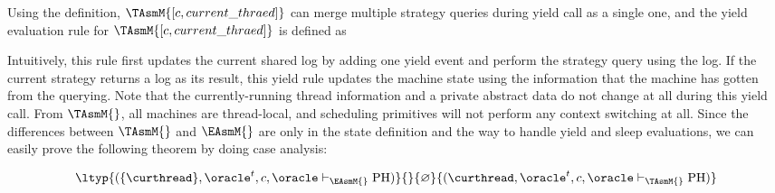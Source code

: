 Using the definition, $\TAsmM{[c, current\_thraed]}$ can merge multiple strategy queries during yield call as a single one, 
and the yield evaluation rule for $\TAsmM{[c, current\_thraed]}$ is defined as
\begin{small}
\begin{mathpar}
\end{mathpar}
\end{small}%
Intuitively, this rule first updates the current shared log by adding one yield event 
and perform the strategy query using the log.
If the current strategy returns a log as its result,
this yield rule updates the machine state using
the information that the machine has gotten from the querying. 
Note that the currently-running thread information and a private abstract data do not change at all 
during this yield call. 
From $\TAsmM{}$, all machines are thread-local, 
and scheduling primitives will not perform any context switching at all. 
Since the differences between $\TAsmM{}$ and $\EAsmM{}$ are only in the state definition 
and the way to handle yield and sleep evaluations, 
we can easily prove the following theorem by doing case analysis:

\begin{theorem}
\begin{small}
$$\ltyp{(\{\curthread\}, \oracle^{t}, c, \oracle  \vdash_{\EAsmM{}} \mathrm{PH})}{}{\varnothing}
{(\curthread, \oracle^{t}, c, \oracle \vdash_{\TAsmM{}} \mathrm{PH})}$$
\end{small}
\label{theorem:tasm-refines-easm}
\end{theorem}

